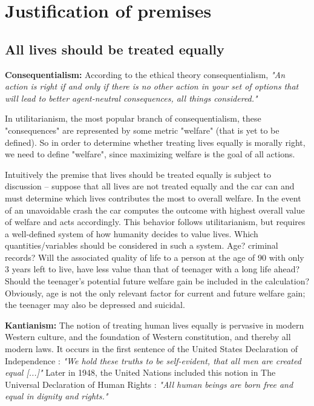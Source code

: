 \section{Justification of premises}


\subsection{All lives should be treated equally}
\textbf{Consequentialism:} According to the ethical theory consequentialism, \textit{"An action is right if and only if there is no other action in your set of options that will lead to better agent-neutral consequences, all things considered."} \cite{MMA}

In utilitarianism, the most popular branch of consequentialism, these "consequences" are represented by some metric "welfare" (that is yet to be defined). So in order to determine whether treating lives equally is morally right, we need to define "welfare", since maximizing welfare is the goal of all actions.

Intuitively the premise that lives should be treated equally is subject to discussion --
suppose that all lives are not treated equally and the car can and must determine which lives
contributes the most to overall welfare.
In the event of an unavoidable crash the car computes the outcome with highest overall value of welfare and acts accordingly.
This behavior follows utilitarianism, but requires a well-defined system of
how humanity decides to value lives. Which quantities/variables should be
considered in such a system. Age? criminal records?
Will the associated quality of life to a person at the age of 90 with only 3 years left to live,
have less value than that of teenager with a long life ahead? Should the teenager's potential future welfare gain be included in the calculation?
Obviously, age is not the only relevant factor for current and future welfare gain; the teenager may also be depressed and suicidal.

\textbf{Kantianism:} The notion of treating human lives equally is pervasive in modern Western culture, and the foundation of Western constitution, and thereby all modern laws. It occurs in the first sentence of the United States Declaration of Independence \cite{Declaration}: \textit{"We hold these truths to be self-evident, that all men are created equal [...]"} Later in 1948, the United Nations included this notion in The Universal Declaration of Human Rights \cite{UN}: \textit{"All human beings are born free and equal in dignity and rights."}

